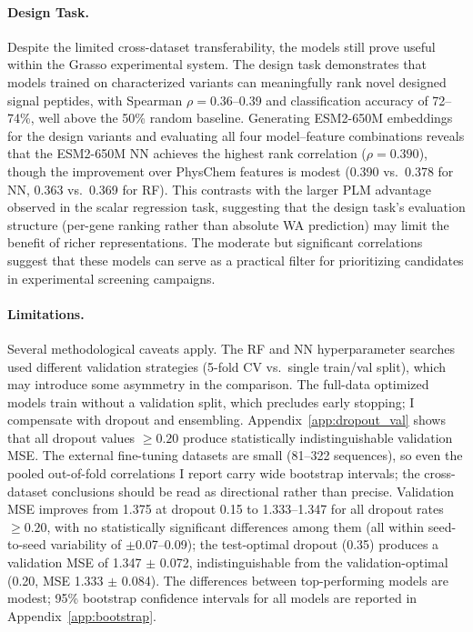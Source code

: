 \documentclass[12pt]{article}
\begin{document}
\paragraph{Design Task.}
Despite the limited cross-dataset transferability, the models still prove useful within the Grasso experimental system.
The design task demonstrates that models trained on characterized variants can meaningfully rank novel designed signal peptides, with Spearman $\rho = 0.36$--0.39 and classification accuracy of 72--74\%, well above the 50\% random baseline.
Generating ESM2-650M embeddings for the design variants and evaluating all four model--feature combinations reveals that the ESM2-650M NN achieves the highest rank correlation ($\rho = 0.390$), though the improvement over PhysChem features is modest (0.390 vs.\ 0.378 for NN, 0.363 vs.\ 0.369 for RF).
This contrasts with the larger PLM advantage observed in the scalar regression task, suggesting that the design task's evaluation structure (per-gene ranking rather than absolute WA prediction) may limit the benefit of richer representations.
The moderate but significant correlations suggest that these models can serve as a practical filter for prioritizing candidates in experimental screening campaigns.

\paragraph{Limitations.}
Several methodological caveats apply.
The RF and NN hyperparameter searches used different validation strategies (5-fold CV vs.\ single train/val split), which may introduce some asymmetry in the comparison.
The full-data optimized models train without a validation split, which precludes early stopping; I compensate with dropout and ensembling.
Appendix~\ref{app:dropout_val} shows that all dropout values $\geq 0.20$ produce statistically indistinguishable validation MSE.
The external fine-tuning datasets are small (81--322 sequences), so even the pooled out-of-fold correlations I report carry wide bootstrap intervals; the cross-dataset conclusions should be read as directional rather than precise.
Validation MSE improves from 1.375 at dropout 0.15 to 1.333--1.347 for all dropout rates $\geq 0.20$, with no statistically significant differences among them (all within seed-to-seed variability of $\pm$0.07--0.09); the test-optimal dropout (0.35) produces a validation MSE of 1.347 $\pm$ 0.072, indistinguishable from the validation-optimal (0.20, MSE 1.333 $\pm$ 0.084).
The differences between top-performing models are modest; 95\% bootstrap confidence intervals for all models are reported in Appendix~\ref{app:bootstrap}.
\end{document}
